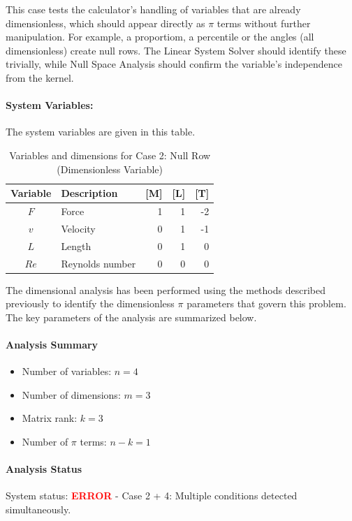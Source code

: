 This case tests the calculator's handling of variables that are already dimensionless, which should appear directly as $\pi$ terms without further manipulation. For example, a proportiom, a percentile or the angles (all dimensionless) create null rows. The Linear System Solver should identify these trivially, while Null Space Analysis should confirm the variable's independence from the kernel.

\paragraph{System Variables: } The system variables are given in this table.

\begin{table}[H]
\centering
\begin{tabular}{|c|l|r|r|r|}
\hline
\textbf{Variable} & \textbf{Description} & \textbf{[M]} & \textbf{[L]} & \textbf{[T]} \\
\hline
$F$ & Force & 1 & 1 & -2 \\
$v$ & Velocity & 0 & 1 & -1 \\
$L$ & Length & 0 & 1 & 0 \\
$Re$ & Reynolds number & 0 & 0 & 0 \\

\hline
\end{tabular}
\caption{Variables and dimensions for Case 2: Null Row (Dimensionless Variable)}
\end{table}

The dimensional analysis has been performed using the methods described previously to identify the dimensionless $\pi$ parameters that govern this problem. The key parameters of the analysis are summarized below.

\paragraph{Analysis Summary}
\begin{itemize}
\item Number of variables: $n = 4$
\item Number of dimensions: $m = 3$
\item Matrix rank: $k = 3$
\item Number of $\pi$ terms: $n - k = 1$
\end{itemize}

\paragraph{Analysis Status}
System status: \textcolor{red}{\textbf{ERROR}} - Case 2 + 4: Multiple conditions detected simultaneously.

